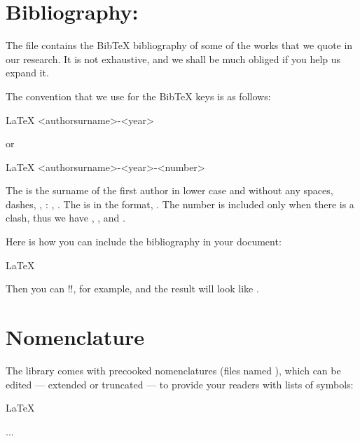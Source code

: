 {{\section{Bibliography: }

The file  contains the BibTeX bibliography of some of the works that we quote in our research. It is not exhaustive, and we shall be much obliged if you help us expand it.

The convention that we use for the BibTeX keys is as follows:
\begin{snippet}{LaTeX}
<authorsurname>-<year>
\end{snippet}
or
\begin{snippet}{LaTeX}
<authorsurname>-<year>-<number>
\end{snippet}
The  is the surname of the first author in lower case and without any spaces, dashes, \etc, \eg: , . The  is in the  format, . The number is included only when there is a clash, thus we have , , and .

Here is how you can include the bibliography in your document:
\begin{snippet}{LaTeX}


\end{snippet}

Then you can \code!\cite{edalat-1998}!, for example, and the result will look like \cite{edalat-1998}.

\section{Nomenclature}

The library comes with precooked nomenclatures (files named ), which can be edited --- extended or truncated --- to provide your readers with lists of symbols:
\begin{snippet}{LaTeX}
\makenomenclature



...



\printnomenclature

 
\end{snippet}

}}
